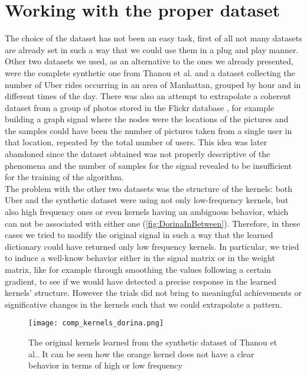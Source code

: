 \section{Working with the proper dataset}
The choice of the dataset has not been an easy task, first of all not many datasets are already set in such a way that we could use them in a plug and play manner. Other two datasets we used, as an alternative to the ones we already presented, were the complete synthetic one from Thanou et al. and a dataset collecting the number of Uber rides occurring in an area of Manhattan, grouped by hour and in different times of the day. There was also an attempt to extrapolate a coherent dataset from a group of photos stored in the Flickr database \cite{McAuley2012}, for example building a graph signal where the nodes were the locations of the pictures and the samples could have been the number of pictures taken from a single user in that location, repeated by the total number of users. This idea was later abandoned since the dataset obtained was not properly descriptive of the phenomena and the number of samples for the signal revealed to be insufficient for the training of the algorithm.\\

The problem with the other two datasets was the structure of the kernels: both Uber and the synthetic dataset were using not only low-frequency kernels, but also high frequency ones or even kernels having an ambiguous behavior, which can not be associated with either one (\autoref{fig:DorinaInBetween}). Therefore, in these cases we tried to modify the original signal in such a way that the learned dictionary could have returned only low frequency kernels. In particular, we tried to induce a well-know behavior either in the signal matrix or in the weight matrix, like for example through smoothing the values following a certain gradient, to see if we would have detected a precise response in the learned kernels' structure. However the trials did not bring to meaningful achievements or significative changes in the kernels such that we could extrapolate a pattern.

\begin{figure}[tb]
  \centering
  \texttt{[image: comp\_kernels\_dorina.png]}
  \caption{The original kernels learned from the synthetic dataset of Thanou et al.. It can be seen how the orange kernel does not have a clear behavior in terms of high or low frequency}
  \label{fig:DorinaInBetween}
\end{figure}

